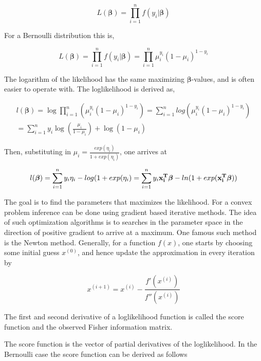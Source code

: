 \begin{equation}
    L(\bm{\beta}) = \prod_{i=1}^{n} f(y_i |\bm{ \beta})
\end{equation}

For a Bernoulli distribution this is,

\begin{equation}
    L(\bm{\beta}) = \prod_{i=1}^{n} f(y_i |\bm{ \beta}) = \prod_{i=1}^{n} \mu_i^{y_i}(1-\mu_i)^{1-y_i}
\end{equation}

The logarithm of the likelihood has the same maximizing $\bm{\beta}$-values, and is often easier to operate with. The loglikelihood is derived as,

\begin{equation}
\begin{split}
    l(\bm{\beta}) = \log \prod_{i=1}^{n} (\mu_i^{y_i}(1-\mu_i)^{1-y_i})  =
    \sum_{i=1}^n log (\mu_i^{y_i}(1-\mu_i)^{1-y_i})\\ =  \sum_{i=1}^{n} y_i \log(\frac{\mu_i}{1-\mu_i}) + \log(1-\mu_i)
\end{split}
\end{equation}

Then, substituting in $\mu_i = \frac{exp(\eta_i)}{1+exp(\eta_i)}$, one arrives at

\begin{equation}
    l(\bm{\beta}) = \sum_{i=1}^{n} y_i \eta_i - log(1 + exp(\eta_i) = \sum_{i=1}^n y_i{\bf x_i^T} \bm{ \beta} - ln(1 + exp(\bf x_i^T \bm{ \beta}))
\end{equation}

The goal is to find the parameters that maximizes the likelihood. For a convex problem inference can be done using gradient based iterative methods. The idea of such optimization algorithms is to searches in the parameter space in the direction of positive gradient to arrive at a maximum. One famous such method is the Newton method. Generally, for a function $f(x)$, one starts by choosing some initial guess $x^{(0)}$, and hence update the approximation in every iteration by

\begin{equation}
    x^{(i+1)} = x^{(i)} - \frac{f'(x^{(i)})}{f''(x^{(i)})}
\end{equation}

The first and second derivative of a loglikelihood function is called the score function and the observed Fisher information matrix.

The score function is the vector of partial derivatives of the loglikelihood. In the Bernoulli case the score function can be derived as follows

